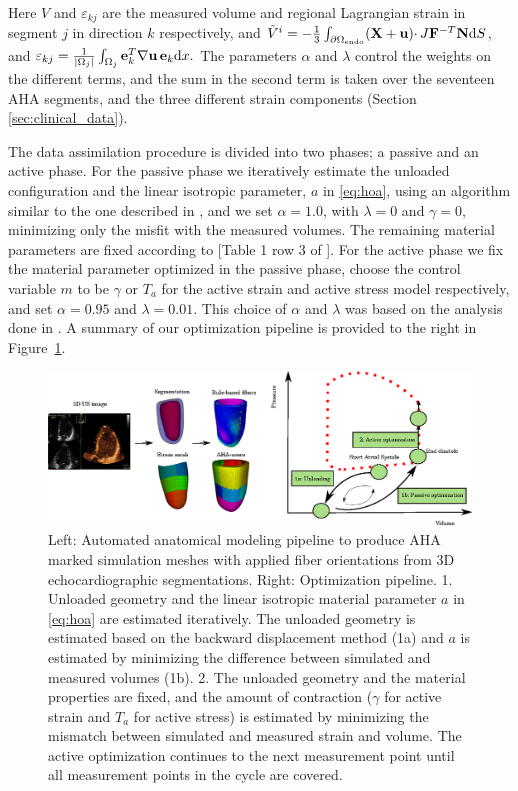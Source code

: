 Here $V$ and $\varepsilon_{kj}$ are the measured volume and regional Lagrangian strain in
segment $j$ in direction $k$ respectively, and $\tilde{V}^i =
-\frac{1}{3} \int_{\partial \Omega_{\text{endo}}} (\mathbf{X} + \mathbf{u})
\cdotp J\mathbf{F}^{-T}\mathbf{N}  \mathrm{d}S$,  and $\varepsilon_{kj} =
\frac{1}{|\Omega_j|}\int_{\Omega_j}  \mathbf{e}_k^T \nabla \mathbf{u} \,
\mathbf{e}_k  \mathrm{d}x.$ 
The parameters $\alpha$ and $\lambda$
control the weights on the different terms, and the sum in the second
term is taken over the seventeen AHA
segments, and the three different strain components (Section \ref{sec:clinical_data}).


The data assimilation procedure is divided into two phases; a passive
and an active phase. For the passive phase we iteratively
  estimate the unloaded configuration and the linear isotropic parameter, $a$ in
\eqref{eq:hoa}, using an algorithm similar to the one described in
\cite{nikou2016effects}, and we set $\alpha= 1.0$,  with $\lambda = 0$ and
$\gamma = 0$, minimizing only the misfit with the measured volumes. The
remaining material parameters are fixed according to [Table 1 row 3 of
\cite{holzapfel2009constitutive}]. For the active phase we fix the material parameter optimized in the
passive phase, choose the control variable $m$ to be $\gamma$ or
$T_a$ for the active strain and active stress model respectively, and
set $\alpha = 0.95$ and $\lambda = 0.01$. This choice of $\alpha$ and
$\lambda$ was based on the analysis done in \cite{balaban}. A summary
of our optimization pipeline is provided to the right in
Figure~\ref{fig:pipeline}.





\begin{figure}[htbp]
\centering
    \includegraphics[width=\textwidth]{models}
\caption{Left: Automated anatomical modeling pipeline to produce AHA
  marked simulation meshes with applied fiber orientations from 3D
  echocardiographic segmentations. Right: Optimization
  pipeline. 1. Unloaded geometry and the linear isotropic
  material parameter $a$ in \eqref{eq:hoa} are estimated iteratively. The unloaded geometry is
  estimated based on the backward displacement method (1a)
  \cite{nikou2016effects} and $a$ is estimated by minimizing the
  difference between simulated and measured volumes (1b). 2. The unloaded
  geometry and the material properties are fixed, and the amount of
  contraction ($\gamma$ for active strain and $T_a$ for active stress)
  is estimated by minimizing the mismatch between simulated and
  measured strain and volume. The active optimization continues to the
  next measurement point until all measurement points in the cycle are covered.}
\label{fig:pipeline}
\end{figure}

